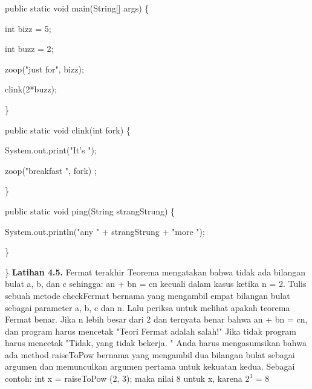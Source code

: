 public static void main(String[] args) \{
\par
	int bizz = 5;
	\par
	int buzz = 2;
	\par
	zoop("just for", bizz);
	\par
	clink(2*buzz);
	\par
\}
\newline
\par
public static void clink(int fork) \{
\par
	System.out.print("It's ");
	\par
	zoop("breakfast ", fork) ;
	\par
\}
\newline
\par

public static void ping(String strangStrung) \{
	\par
	System.out.println("any " + strangStrung + "more ");
	\par
\}
\par
\}
\newline
\newline
\textbf{Latihan 4.5.} Fermat terakhir Teorema mengatakan bahwa tidak ada bilangan bulat a, b, dan c sehingga:
\newline
an + bn = cn
\newline
\newline
kecuali dalam kasus ketika n = 2.
\newline
\newline
Tulis sebuah metode checkFermat bernama yang mengambil empat bilangan bulat sebagai parameter a, b, c dan n. Lalu periksa untuk melihat apakah teorema Fermat benar. Jika n lebih besar dari 2 dan ternyata benar bahwa an + bn = cn, dan program harus mencetak "Teori Fermat adalah salah!" Jika tidak program harus mencetak "Tidak, yang tidak bekerja. "
\newline
Anda harus mengasumsikan bahwa ada method raiseToPow bernama yang mengambil dua bilangan bulat sebagai argumen dan memunculkan argumen pertama untuk kekuatan kedua. Sebagai contoh:
\newline
\newline
int x = raiseToPow (2, 3);
\newline
\newline
maka nilai 8 untuk x, karena $2^3$ = 8
